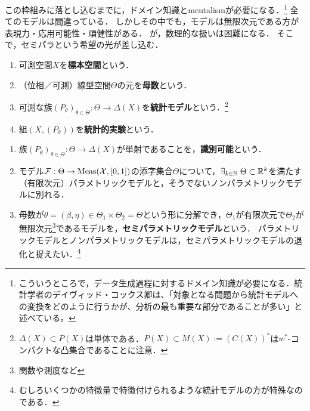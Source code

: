 \documentclass[uplatex,dvipdfmx]{jsreport}
\begin{document}
\begin{tcolorbox}[colframe=ForestGreen, colback=ForestGreen!10!white,breakable,colbacktitle=ForestGreen!40!white,coltitle=black,fonttitle=\bfseries\sffamily,
title=]
    この枠組みに落とし込むまでに，ドメイン知識とmentalismが必要になる．\footnote{こういうところで，データ生成過程に対するドメイン知識が必要になる．統計学者のデイヴィッド・コックス卿は、「対象となる問題から統計モデルへの変換をどのように行うかが、分析の最も重要な部分であることが多い」と述べている。}
    全てのモデルは間違っている．
    しかしその中でも，モデルは無限次元である方が表現力・応用可能性・頑健性がある．
    が，数理的な扱いは困難になる．
    そこで，セミパラという希望の光が差し込む．
\end{tcolorbox}

\begin{definition}\mbox{}
    \begin{enumerate}
        \item 可測空間$X$を\textbf{標本空間}という．
        \item （位相／可測）線型空間$\Theta$の元を\textbf{母数}という．
        \item 可測な族$(P_\theta)_{\theta\in\Theta}:\Theta\to\Delta(X)$を\textbf{統計モデル}という．\footnote{$\Delta(X)\subset P(X)$は単体である．$P(X)\subset M(X):=(C(X))^*$は$w^*$-コンパクトな凸集合であることに注意．}
        \item 組$(X,(P_\theta))$を\textbf{統計的実験}という．
    \end{enumerate}
\end{definition}

\begin{definition}\mbox{}
    \begin{enumerate}
        \item 族$(P_\theta)_{\theta\in\Theta}:\Theta\to\Delta(X)$が単射であることを，\textbf{識別可能}という．
        \item モデル$\mathcal{F}:\Theta\to\mathrm{Meas}(\mathcal{X},[0,1])$の添字集合$\Theta$について，$\exists_{k\in\mathbb{N}}\;\Theta\subset\mathbb{R}^k$を満たす（有限次元）パラメトリックモデルと，そうでないノンパラメトリックモデルに別れる．
        \item 母数が$\theta=(\beta,\eta)\in\Theta_1\times\Theta_2=\Theta$という形に分解でき，$\Theta_1$が有限次元で$\Theta_2$が無限次元\footnote{関数や測度など}であるモデルを，\textbf{セミパラメトリックモデル}という．
        パラメトリックモデルとノンパラメトリックモデルは，セミパラメトリックモデルの退化と捉えたい．\footnote{むしろいくつかの特徴量で特徴付けられるような統計モデルの方が特殊なのである．}
    \end{enumerate}
\end{definition}
\end{document}
